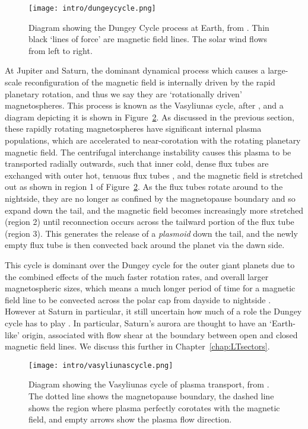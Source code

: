 \begin{figure}
\centering
\noindent\texttt{[image: intro/dungeycycle.png]}
\caption[Diagram of the Dungey cycle.]{Diagram showing the Dungey Cycle process at Earth, from \citet{dungey1961}. Thin black `lines of force' are magnetic field lines. The solar wind flows from left to right.}
\label{intro:fig:dungeycycle}
\end{figure}

At Jupiter and Saturn, the dominant dynamical process which causes a large-scale reconfiguration of the magnetic field is internally driven by the rapid planetary rotation, and thus we say they are `rotationally driven' magnetospheres. This process is known as the Vasyliunas cycle, after \citet{vasyliunas1983}, and a diagram depicting it is shown in Figure~\ref{intro:fig:vasyliunascycle}. As discussed in the previous section, these rapidly rotating magnetospheres have significant internal plasma populations, which are accelerated to near-corotation with the rotating planetary magnetic field. The centrifugal interchange instability causes this plasma to be transported radially outwards, such that inner cold, dense flux tubes are exchanged with outer hot, tenuous flux tubes \citep{southwood1989}, and the magnetic field is stretched out as shown in region 1 of Figure~\ref{intro:fig:vasyliunascycle}. As the flux tubes rotate around to the nightside, they are no longer as confined by the magnetopause boundary and so expand down the tail, and the magnetic field becomes increasingly more stretched (region 2) until reconnection occurs across the tailward portion of the flux tube (region 3). This generates the release of a \textit{plasmoid} down the tail, and the newly empty flux tube is then convected back around the planet via the dawn side. 

This cycle is dominant over the Dungey cycle for the outer giant planets due to the combined effects of the much faster rotation rates, and overall larger magnetospheric sizes, which means a much longer period of time for a magnetic field line to be convected across the polar cap from dayside to nightside \citep{forsyth2010}. However at Saturn in particular, it still uncertain how much of a role the Dungey cycle has to play \citep[e.g.][]{cowley2005}. In particular, Saturn's aurora are thought to have an `Earth-like' origin, associated with flow shear at the boundary between open and closed magnetic field lines. We discuss this further in Chapter~\ref{chap:LTsectors}.

\begin{figure}
\centering
\noindent\texttt{[image: intro/vasyliunascycle.png]}
\caption[Diagram of the Vasyliunas cycle.]{Diagram showing the Vasyliunas cycle of plasma transport, from \citet{vasyliunas1983}. The dotted line shows the magnetopause boundary, the dashed line shows the region where plasma perfectly corotates with the magnetic field, and empty arrows show the plasma flow direction.}
\label{intro:fig:vasyliunascycle}
\end{figure}

